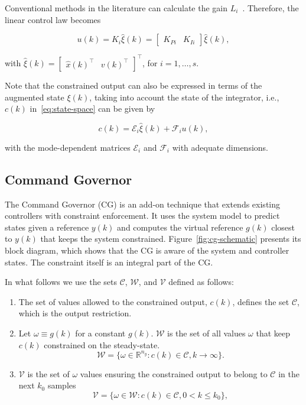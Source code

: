 Conventional methods in the literature can calculate the gain
\(L_i\)~\parencite{chen:linear,hespanha:linear}. Therefore, the linear control
law becomes

\begin{equation}
	\label{eq:control-law}
	u(k)= K_i \hat{\xi}(k) = \begin{bmatrix}K_{Pi} & K_{Ii} \end{bmatrix}
	\hat{\xi}(k),
\end{equation}

with \(\hat{\xi}(k) = \begin{bmatrix}\hat{x}{(k)}^\top & v{(k)}^\top
\end{bmatrix}^\top{}\), for \(i=1,\ldots,s\).

Note that the constrained output can also be expressed in terms of the augmented
state \(\xi(k)\), taking into account the state of the integrator, i.e., \(c(k)\)
in~\eqref{eq:state-space} can be given by

\begin{equation}
	\label{eq:constrained-output}
	c(k) = \mathcal{E}_i\hat{\xi}(k) + \mathcal{F}_i u(k),
\end{equation}

with the mode-dependent matrices \(\mathcal{E}_i\) and \(\mathcal{F}_i\) with
adequate dimensions.

\subsection{Command Governor}%
\label{subsec:cg}

The Command Governor (CG) is an add-on technique that extends existing
controllers with constraint enforcement. It uses the system model to predict
states given a reference \(y(k)\) and computes the virtual reference \(g(k)\)
closest to \(y(k)\) that keeps the system constrained.
Figure~\ref{fig:cg-schematic} presents its block diagram, which shows that the
CG is aware of the system and controller states. The constraint itself is an
integral part of the CG.\



In what follows we use the sets \(\mathcal{C}\), \(\mathcal{W}\), and
\(\mathcal{V}\) defined as follows:

\begin{enumerate}
	\item The set of values allowed to the  constrained output, \(c(k)\),
	      defines the set \(\mathcal{C}\), which is the output restriction.
	\item Let \(\omega\equiv g(k)\) for a constant \(g(k)\). \(\mathcal{W}\) is
	      the set of all values \(\omega{}\) that keep \(c(k)\) constrained on
	      the steady-state.
	      \[\mathcal{W} = \{\omega\in\mathbb{R}^{n_y}:
		      c(k)\in\mathcal{C},k\rightarrow\infty{}\}.\]
	\item \(\mathcal{V}\) is the set of \(\omega{}\) values ensuring the
	      constrained output to belong to \(\mathcal{C}\) in the next \(k_0\)
	      samples
	      \[
		      \mathcal{V}=\{\omega\in\mathcal{W}:c(k)\in\mathcal{C},0<k\leq{}k_0\},
	      \]
\end{enumerate}

